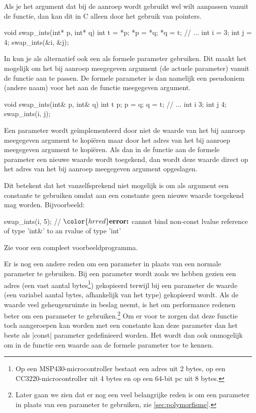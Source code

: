 \begin{cpplstShortInline}
Als je het argument dat bij de aanroep wordt gebruikt wel wilt aanpassen vanuit de functie, dan kan dit in C alleen door het gebruik van pointers.
\begin{lstfragment}[style=cstyle]
void swap_ints(int* p, int* q) {
    int t = *p;
    *p = *q;
    *q = t;
}
//  ...
    int i = 3;
    int j = 4;
    swap_ints(&i, &j);
\end{lstfragment}

In \Cpp{} kun je als alternatief ook een  als formele parameter gebruiken. 		
Dit maakt het mogelijk om het bij aanroep meegegeven argument (de actuele parameter) vanuit de functie aan te passen. 
De formele parameter is dan namelijk een pseudoniem (andere naam) voor het aan de functie meegegeven argument.
\label{code:swap_ints}
\begin{cpplstfragment}
void swap_ints(int& p, int& q) {
    int t {p};
    p = q;
    q = t;
}
//  ...
    int i {3};
    int j {4};
    swap_ints(i, j);
\end{cpplstfragment}

Een  parameter wordt geïmplementeerd door niet de waarde van het bij aanroep meegegeven argument te kopiëren maar door het adres van het bij aanroep meegegeven argument te kopiëren. 
Als dan in de functie aan de formele parameter een nieuwe waarde wordt toegekend, dan wordt deze waarde direct op het adres van het bij aanroep meegegeven argument opgeslagen.

Dit betekent dat het vanzelfsprekend niet mogelijk is om als argument een constante te gebruiken omdat aan een constante geen nieuwe waarde toegekend mag worden. Bijvoorbeeld:
\begin{cpplstfragment}[mathescape=true]
    swap_ints(i, 5);
//  $\color{hrred}\textbf{error:}$ cannot bind non-const lvalue reference of type 'int&' to an rvalue of type 'int'
\end{cpplstfragment}

Zie  voor een compleet voorbeeldprogramma.

\label{sec:constreferenceparameter}
Er is nog een andere reden om een  parameter in plaats van een normale  parameter te gebruiken. 
Bij een  parameter wordt zoals we hebben gezien een adres (een vast aantal bytes\footnote{Op een MSP430-microcontroller bestaat een adres uit 2 bytes, op een CC3220-microcontroller uit 4 bytes en op een 64-bit pc uit 8 bytes.}) gekopieerd terwijl bij een  parameter de waarde (een variabel aantal bytes, afhankelijk van het type) gekopieerd wordt. 
Als de waarde veel geheugenruimte in beslag neemt, is het om performance redenen beter om een  parameter te gebruiken.\footnote{Later gaan we zien dat er nog een veel belangrijke reden is om een  parameter in plaats van een  parameter te gebruiken, zie \cref{sec:polymorfisme}.}
Om er voor te zorgen dat deze functie toch aangeroepen kan worden met een constante kan deze parameter dan het beste als |const|  parameter gedefinieerd worden. Het wordt dan ook onmogelijk om in de functie een waarde aan de formele parameter toe te kennen.


\end{cpplstShortInline}

